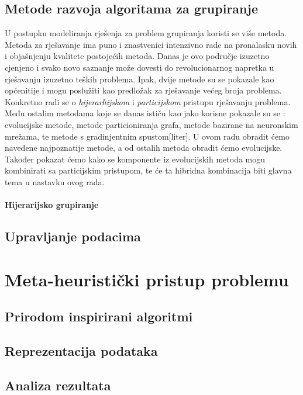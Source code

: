 \documentclass[a4paper,twoside,12pt]{memoir} %
\begin{document}
\section[Metode razvoja algoritama za grupiranje][metode razvoja]{Metode razvoja algoritama za grupiranje}
U postupku modeliranja rješenja za problem grupiranja koristi se više metoda. Metoda za rješavanje ima puno i znastvenici intenzivno rade na pronalasku novih i objašnjenju kvalitete postojećih metoda. Danas je ovo područje izuzetno cjenjeno i svako novo saznanje može dovesti do revolucionarnog napretka u rješavanju izuzetno teških problema. Ipak, dvije metode su se pokazale kao općenitije i mogu poslužiti kao predložak za rješavanje većeg broja problema. Konkretno radi se o \textit{hijerarhijskom} i \textit{particijskom} pristupu rješavanju problema. Među ostalim metodama koje se danas ističu kao jako korisne pokazale su se : evolucijske metode, metode particioniranja grafa, metode bazirane na neuronskim mrežama, te metode s gradinjentnim spustom[liter]. U ovom radu obradit ćemo navedene najpoznatije metode, a od ostalih metoda obradit ćemo evolucijske. Također pokazat ćemo kako se komponente iz evolucijskih metoda mogu kombinirati sa particijskim pristupom, te će ta hibridna kombinacija biti glavna tema u nastavku ovog rada.

\subsubsection{Hijerarijsko grupiranje}

\section[Upravljanje podacima][upravljanje-podacima]{Upravljanje podacima}
\label{sec:upravljanje-pod}
\chapter[Metaheuristike]{Meta-heuristički pristup problemu}
\section[Prirodom inspirirani algoritmi][prirodni-algoritmi]{Prirodom inspirirani algoritmi}
\section{Reprezentacija podataka}
\section{Analiza rezultata}
\end{document}
